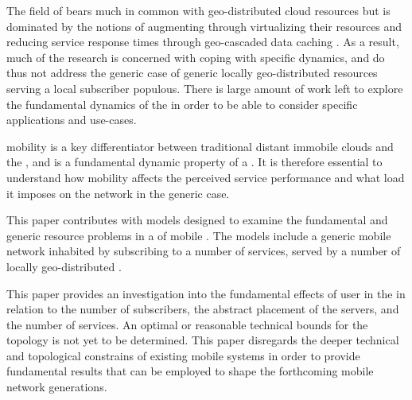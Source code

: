 The field of \xcloud{} bears much in common with geo-distributed cloud resources but is dominated by the notions of augmenting \ues{} through virtualizing their resources \cite{6563280} and reducing service response times through geo-cascaded data caching \cite{1437087,ericsson_akami}. As a result, much of the research is concerned with coping with specific dynamics, and do thus not address the generic case of generic locally geo-distributed resources serving a local subscriber populous. There is large amount of work left to explore the fundamental dynamics of the \xcloud{} in order to be able to consider specific applications and use-cases.

\Ue{} mobility is a key differentiator between traditional distant immobile clouds and the \xcloud{}, and is a fundamental dynamic property of a \xcloud{}. It is therefore essential to understand how \ue{} mobility affects the perceived service performance and what load it imposes on the network in the generic case.

This paper contributes with models designed to examine the fundamental and generic resource problems in a \xcloud{} of mobile \ues{}. The models include a generic mobile network inhabited by \ues{} subscribing to a number of services, served by a number of locally geo-distributed \dcs{}.

This paper provides an investigation into the fundamental effects of user \ue{} in the \xcloud{} in relation to the number of subscribers, the abstract placement of the servers, and the number of services. An optimal or reasonable technical bounds for the \xcloud{} topology is not yet to be determined. This paper disregards the deeper technical and topological constrains of existing mobile systems in order to provide fundamental results that can be employed to shape the forthcoming mobile network generations.